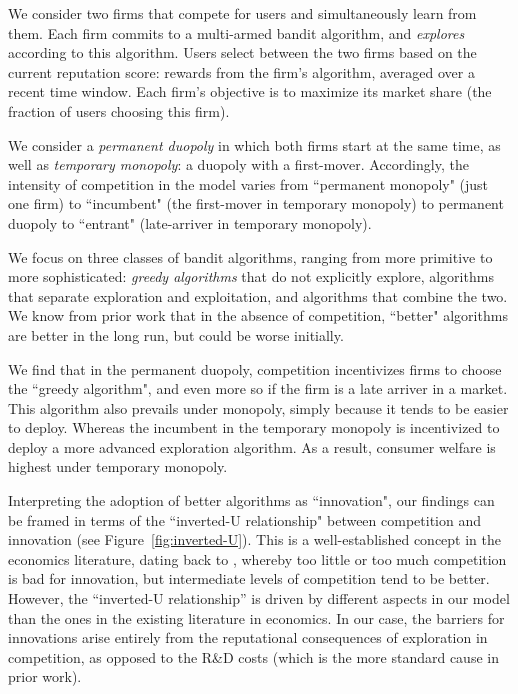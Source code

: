 \documentclass[../competing_bandits_with_appendix.tex]{subfiles}
\begin{document}
 We consider two firms that compete for users and simultaneously learn from them. Each firm commits to a multi-armed bandit algorithm, and \emph{explores} according to this algorithm. Users select between the two firms based on the current reputation score: rewards from the firm's algorithm, averaged over a recent time window. Each firm's objective is to maximize its market share (the fraction of users choosing this firm).



We consider a \emph{permanent duopoly} in which both firms start at the same time, as well as \emph{temporary monopoly}: a duopoly with a first-mover. Accordingly, the intensity of competition in the model varies from ``permanent monopoly" (just one firm) to ``incumbent" (the first-mover in temporary monopoly) to permanent duopoly to ``entrant" (late-arriver in temporary monopoly).

We focus on three classes of bandit algorithms, ranging from more primitive to more sophisticated: \emph{greedy algorithms} that do not explicitly explore, algorithms that separate exploration and exploitation, and algorithms that combine the two. We know from prior work that in the absence of competition,  ``better" algorithms are better in the long run, but could be worse initially.


We find that in the permanent duopoly, competition incentivizes firms to choose the ``greedy algorithm", and even more so if the firm is a late arriver in a market. This algorithm also prevails under monopoly, simply because it tends to be easier to deploy. Whereas the incumbent in the temporary monopoly is incentivized to deploy a more advanced exploration algorithm. As a result, consumer welfare is highest under temporary monopoly. 



Interpreting the adoption of better algorithms as ``innovation", our
findings can be framed in terms of the ``inverted-U relationship"
between competition and innovation (see Figure~\ref{fig:inverted-U}).
This is a well-established concept in the economics literature, dating
  back to \cite{Schumpeter-42}, whereby too
  little or too much competition is bad for innovation, but
  intermediate levels of competition tend to be better. However, the
``inverted-U relationship'' is driven by different aspects in our
model than the ones in the existing literature in economics. In our
case, the barriers for innovations arise entirely from the
reputational consequences of exploration in competition, as opposed to
the R\&D costs (which is the more standard cause in prior work).
\end{document}
